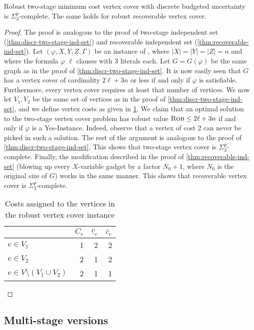 \begin{theorem}
\label{thm:two-stage-and-recoverable-vertex-cover}
Robust two-stage minimum cost vertex cover with discrete budgeted uncertainty is $\Sigma_3^p$-complete. The same holds for robust recoverable vertex cover.
\end{theorem}
\begin{proof}
The proof is analogous to the proof of two-stage independent set (\cref{thm:discr-two-stage-ind-set}) and recoverable independent set (\cref{thm:recoverable-ind-set}). 
Let $(\varphi,X,Y,Z,\Gamma)$ be an instance of {\radj}, where $|X| = |Y| = |Z| = n$ and where the formula $\varphi$  $\ell$ clauses with 3 literals each.
 Let $G = G(\varphi)$ be the same graph as in the proof of \cref{thm:discr-two-stage-ind-set}. 
It is now easily seen that $G$ has a vertex cover of cardinality $2\ell + 3n$ or less if and only if $\varphi$ is satisfiable. 
Furthermore, every vertex cover requires at least that number of vertices. 
We now let $V_1, V_2$ be the same set of vertices as in the proof of \cref{thm:discr-two-stage-ind-set}, and we define vertex costs as given in \cref{table:vertex-cover}. 
We claim that an optimal solution to the two-stage vertex cover problem has robust value $\textsc{Rob} \leq 2\ell + 3n$ if and only if $\varphi$ is a Yes-Instance. 
Indeed, observe that a vertex of cost 2 can never be picked in such a solution. The rest of the argument is analogous to the proof of \cref{thm:discr-two-stage-ind-set}. 
This shows that two-stage vertex cover is $\Sigma_3^p$-complete. 
Finally, the modification described in the proof of \cref{thm:recoverable-ind-set} (blowing up every $X$-variable gadget by a factor $N_0+1$, where $N_0$ is the original size of $G$) works in the same manner. 
This shows that recoverable vertex cover is $\Sigma_3^p$-complete.
\begin{table}
\centering
\begin{tabular}{l|rrr}
& $C_e$ & $\underline{c}_e$ & $\overline{c}_e$ \\
\hline
$e \in V_1$ & 1 & 2 & 2 \\
$e \in V_2$ & 2 & 1 & 2 \\
$e \in V \setminus (V_1 \cup V_2)$ & 2 & 1 & 1 
\end{tabular}
\caption{Costs assigned to the vertices in the robust vertex cover instance}
\label{table:vertex-cover}
\end{table}
\end{proof}


\subsection{Multi-stage versions}
\label{subsec:multistage}

